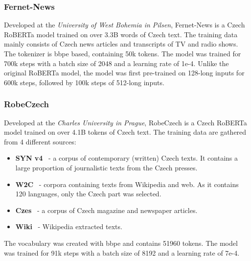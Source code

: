 \subsubsection{Fernet-News}
\label{sec:fernet}
Developed at the \textit{University of West Bohemia in Pilsen}, Fernet-News is a Czech RoBERTa model trained on
over 3.3B words of Czech text. The training data mainly consists of Czech news articles and transcripts of TV and radio shows.
The tokenizer is \ac{bbpe} based, containing 50k tokens.
The model was trained for 700k steps with a batch size of 2048 and a learning rate of 1e-4.
Unlike the original RoBERTa model, the model was first pre-trained on 128-long inputs for 600k steps, followed by 100k steps
of 512-long inputs.

\subsubsection{RobeCzech}
\label{sec:robe-czech}
Developed at the \textit{Charles University in Prague}, RobeCzech is a Czech RoBERTa model trained on over
4.1B tokens of Czech text. The training data are gathered from 4 different sources:
\begin{itemize}
    \item \textbf{SYN v4}~\parencite*{11234/1-1846} - a corpus of contemporary (written) Czech texts. It contains a large proportion
          of journalistic texts from the Czech presses.
    \item \textbf{W2C}~\parencite*{11858/00-097C-0000-0022-6133-9} - corpora containing texts from Wikipedia and web. As it contains 120 languages, only the Czech part was selected.
    \item \textbf{Czes}~\parencite*{11858/00-097C-0000-0001-CCCF-C} - a corpus of Czech magazine and newspaper articles.
    \item \textbf{Wiki}~\parencite*{strakaRobeCzechCzechRoBERTa2021} - Wikipedia extracted texts.
\end{itemize}
The vocabulary was created with \ac{bbpe} and contains 51960 tokens.
The model was trained for 91k steps with a batch size of 8192 and a learning rate of 7e-4.


